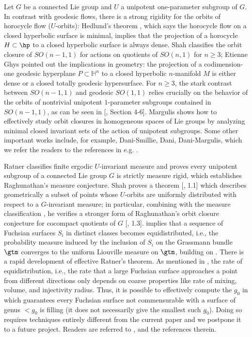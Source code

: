 Let $G$ be a connected Lie group and $U$ a unipotent one-parameter subgroup of $G$. In contrast with geodesic flows, there is a strong rigidity for the orbits of horocycle flow ($U$-orbits): Hedlund's theorem \cite{hgHorocyclesFlowMinimal}, which says the horocycle flow on a closed hyperbolic surface is minimal, implies that the projection of a horocycle $H \subset \hp$ to a closed hyperbolic surface is always dense. 
Shah \cite{snRatnerTheorem} classifies the orbit closure of $SO(n-1,1)$ for actions on quotients of $SO(n,1)$ for $n\geq 3$; Etienne Ghys pointed out the implications in geometry: the projection of a codimension-one geodesic hyperplane $P\subset \mathbb{H}^n$ to a closed hyperbolic $n$-manifold $M$ is either dense or a closed totally geodesic hypersurface. For $n \geq 3$, the stark contrast between $SO(n-1, 1)$ and geodesic $SO(1,1)$ relies crucially on the behavior of the orbits of nontrivial unipotent $1$-parameter subgroups contained in $SO(n-1,1)$, as can be seen in [, Section 4-6]. Margulis \cite{mgDiscreteSubgroupsErgodicTheory} shows how to effectively study orbit closures in homogeneous spaces of Lie groups by analyzing minimal closed invariant sets of the action of unipotent subgroups. Some other important works include, for example, Dani-Smillie, Dani, Dani-Margulis, which we refer the readers to the references in e.g. \cite{mgDiscreteSubgroupsErgodicTheory,snRatnerTheorem,snUniformlydistributedOrbits,rmRatner'stheorem}. 

 Ratner \cite{rmRatner'stheorem} classifies finite ergodic $U$-invariant measure and proves every unipotent subgroup of a connected Lie group $G$ is strictly measure rigid, which establishes Raghunathan’s measure conjecture. Shah proves a theorem [, 1.1] which describes geometrically a subset of points whose $U$-orbits are uniformly distributed with respect to a $G$-invariant measure; in particular, combining with the measure classification \cite{rmRatner'stheorem}, he verifies a stronger form of Raghunathan’s orbit closure conjecture for cocompact quotients of $G$ [, 1.3]. 
 \cite{msErgodicInvariantMeasure} implies that a sequence of Fuchsian surfaces $S_i$ in distinct \cbility classes becomes equidistributed, i.e., the probability measure induced by the inclusion of $S_i$ on the Grassmann bundle $\gtm$ converges to the uniform Liouville measure on $\gtm$, building on \cite{rmRatner'stheorem}. There is a rapid development of effective Ratner's theorem. As mentioned in \cite{lmPolynomialEffectiveDensity}, the rate of equidistribution, i.e., the rate that a large Fuchsian surface approaches a point from different directions only depends on coarse properties like rate of mixing, volume, and injectivity radius. Thus, it is possible to effectively compute the $g_0$ in  which guarantees every Fuchsian surface not commensurable with a surface of genus $<g_0$ is filling (it does not necessarily give the smallest such $g_0$). Doing so requires techniques entirely different from the current paper and we postpone it to a future project. Readers are referred to \cite{lmPolynomialEffectiveDensity,lmwEffectiveEquidistribution,lyEffectiveRatner}, and the references therein. 
 
